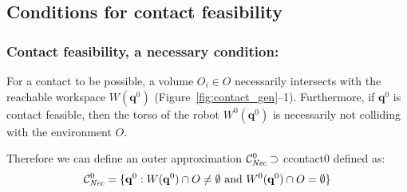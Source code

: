 


   
 
\subsection{Conditions for contact feasibility}




\subsubsection*{Contact feasibility, a necessary condition:}
For a contact to be possible, a volume $O_i \in O$ necessarily intersects with the reachable workspace $W(\mathbf{q}^{0})$ (Figure~\ref{fig:contact_gen}--1). Furthermore, if $\mathbf{q}^{0}$ is \gls{contact feasible}, then the torso of the robot $W^0(\mathbf{q}^{0})$ is necessarily not colliding  with the environment $O$.

Therefore we can define an outer approximation  $ \mathcal{C}^0_{\textrm{\it Nec}} \supset$ \gls{ccontact0} defined as: 
\begin{equation}
\mathcal{C}^0_{\textrm{\it Nec}} = \{ \mathbf{q}^0 : W(\mathbf{q}^{0}) \cap O \neq \emptyset \text{ and } W^0(\mathbf{q}^{0}) \cap O = \emptyset \} %
\end{equation}
 
